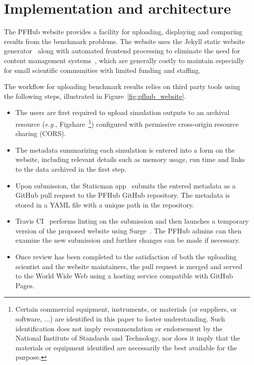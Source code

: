 \documentclass{jors}
\begin{document}
\section*{Implementation and architecture}

The PFHub website provides a facility for uploading, displaying and
comparing results from the benchmark problems. The website uses the
Jekyll static website generator~\cite{jekyll} along with automated
frontend processing to eliminate the need for content management
systems~\cite{cmsfree}, which are generally costly to maintain
especially for small scientific communities with limited funding and
staffing.

The workflow for uploading benchmark results relies on third party
tools using the following steps, illustrated in
Figure~\ref{fig:pfhub_website}.

\begin{itemize}
  \item The users are first required to upload simulation outputs to
    an archival resource (\emph{e.g.}, Figshare~\footnote{Certain
      commercial equipment, instruments, or materials (or suppliers,
      or software, ...) are identified in this paper to foster
      understanding. Such identification does not imply recommendation
      or endorsement by the National Institute of Standards and
      Technology, nor does it imply that the materials or equipment
      identified are necessarily the best available for the
      purpose.\label{disclaimer}}) configured with permissive
    cross-origin resource sharing (CORS).
  \item The metadata summarizing each simulation is entered into a
    form on the website, including relevant details such as memory
    usage, run time and links to the data archived in the first step.
  \item Upon submission, the Staticman app~\cite{staticman} submits
    the entered metadata as a GitHub pull request to the PFHub GitHub
    repository.  The metadata is stored in a YAML file with a unique
    path in the repository.
  \item Travis CI~\cite{travis} performs linting on the submission and
    then launches a temporary version of the proposed website using
    Surge~\cite{surge}. The PFHub admins can then examine the new
    submission and further changes can be made if necessary.
  \item Once review has been completed to the satisfaction of both the
    uploading scientist and the website maintainers, the pull request
    is merged and served to the World Wide Web using a hosting service
    compatible with GitHub Pages.
\end{itemize}
\end{document}
